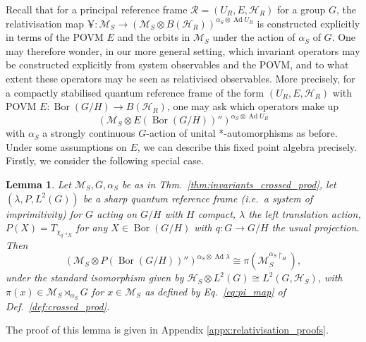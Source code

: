 \documentclass[sn-mathphys-num]{sn-jnl}%
\newcommand{\HH}{\mathcal{H}}
\newcommand{\MM}{\mathcal{M}}
\DeclareMathOperator{\Bor}{Bor}
\DeclareMathOperator{\Ad}{Ad}
\numberwithin{equation}{section}
\theoremstyle{thmstyleone}%
\newtheorem{lemma}[theorem]{Lemma}
\theoremstyle{thmstyletwo}%
\theoremstyle{thmstylethree}%
\begin{document}
    
    Recall that for a principal reference frame $\mathcal{R}=(U_R,E,\HH_R)$ for a group $G$, the relativisation map $\yen:\MM_S\to (\MM_S\otimes B(\HH_R))^{\alpha_S\otimes\Ad U_R}$  is constructed explicitly in terms of the POVM $E$ and the orbits in $\MM_S$ under the action of $\alpha_S$ of $G$. One may therefore wonder, in our more general setting, which invariant operators may be constructed explicitly from system observables and the POVM, and to what extent these operators may be seen as relativised observables. More precisely, for a compactly stabilised quantum reference frame of the form $(U_R,E,\HH_R)$ with POVM $E:\Bor(G/H)\rightarrow B(\HH_R)$, one may ask which operators make up
    \begin{equation}
        \label{eq:inv_alg}
       (\MM_S\otimes E(\Bor(G/H))'')^{\alpha_S\otimes\Ad U_R} 
    \end{equation}
    with $\alpha_S$ a strongly continuous $G$-action of unital *-automorphisms as before. Under some assumptions on $E$, we can describe this fixed point algebra precisely. Firstly, we consider the following special case.
    \begin{lemma}
    \label{lem:pi_range}
        Let $\MM_S,G,\alpha_S$ be as in Thm.\ \ref{thm:invariants_crossed_prod}, let $(\lambda,P,L^2(G))$ be a sharp quantum reference frame (i.e.\ a system of imprimitivity) for $G$ acting on $G/H$ with $H$ compact, $\lambda$ the left translation action, $P(X)=T_{\chi_{q^{-1}X}}$ for any $X\in \Bor(G/H)$ with $q:G\to G/H$ the usual projection. Then
        \begin{equation}
            (\MM_S\otimes P(\Bor(G/H))'')^{\alpha_S\otimes\Ad \lambda}\cong \pi(\MM_S^{\alpha_S\restriction_H}),
        \end{equation}
        under the standard isomorphism given by $\HH_S\otimes L^2(G)\cong L^2(G,\HH_S)$, with $\pi(x)\in \MM_S\rtimes_{\alpha_S}G$ for $x\in \MM_S$ as defined by Eq.\ \eqref{eq:pi_map} of Def.\ \ref{def:crossed_prod}.
    \end{lemma}
    The proof of this lemma is given in Appendix \ref{appx:relativisation_proofs}.
    
\end{document}
